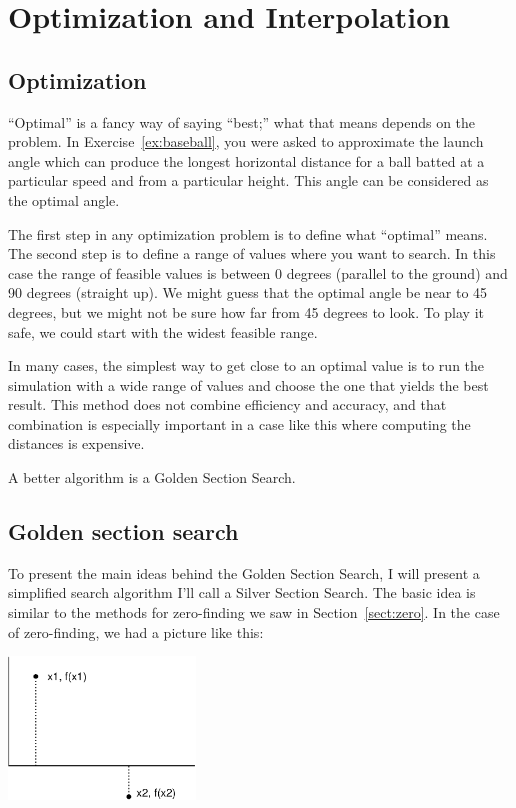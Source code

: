 \documentclass[
]{book}
\begin{document}
\chapter{Optimization and Interpolation}
\section{Optimization}

``Optimal'' is a fancy way of saying ``best;'' what that means depends on the problem.
In Exercise~\ref{ex:baseball}, you were asked to approximate the launch angle which
can produce the longest horizontal distance for a ball batted at a particular speed
and from a particular height.  This angle can be considered as the
optimal angle.

The first step in any optimization problem is to define
what ``optimal'' means.  The second step is to define a range of
values where you want to search. In this case the range of
feasible values is between 0 degrees (parallel to the ground)
and 90 degrees (straight up).  We might guess that the
optimal angle be near to 45 degrees, but we might not be sure
how far from 45 degrees to look.  To play it safe, we could
start with the widest feasible range.

In many cases,
the simplest way to get close to an optimal value is to run the
simulation with a wide range of values and choose the one
that yields the best result.  This
method does not combine efficiency and accuracy,
and that combination is especially important in a case like this where
computing the distances is expensive.

A better algorithm is a Golden Section Search.

\section{Golden section search}

To present the main ideas behind
the Golden Section Search, I will present a simplified
search algorithm I'll call a Silver Section Search.  The basic idea is similar to
the methods for zero-finding we saw in Section~\ref{sect:zero}.  In the
case of zero-finding, we had a picture like this:

\beforefig \centerline{\includegraphics[height=1.5in]{figs/secant.eps}}
\end{document}
